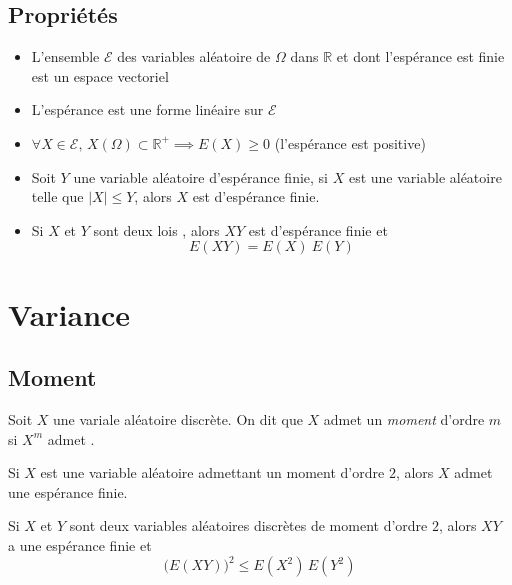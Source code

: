 \documentclass[11pt,a4paper,fleqn,pdftex]{report}
\begin{document}
\subsection{Propriétés} %
\label{sub:esperance_proprietes}
\begin{prop}
     \begin{itemize}
         \item L'ensemble $\mathscr{E}$ des variables aléatoire de $\Omega$ dans $\mathbb{R}$ et dont l'espérance est finie est un espace vectoriel
         \item L'espérance est une forme linéaire sur $\mathscr{E}$
         \item $\forall X \in \mathscr{E},\, X(\Omega) \subset \mathbb{R}^+ \implies E(X) \ge 0$ (l'espérance est positive)
         \item Soit $Y$ une variable aléatoire d'espérance finie, si $X$ est une variable aléatoire telle que $|X| \le Y$, alors $X$ est d'espérance finie.
         \item Si $X$ et $Y$ sont deux lois  , alors $XY$ est d'espérance finie et 
         \begin{equation*}
         E(XY) = E(X)\: E(Y)
         \end{equation*}
     \end{itemize}
\end{prop}
\section{Variance} %
\label{sec:variance}
\subsection{Moment} %
\label{sub:variance_moment}
\needspace{5cm}
\begin{dfn}
     Soit $X$ une variale aléatoire discrète. On dit que $X$ admet un \emph{moment} d'ordre $m$ si $X^m$ admet .
\end{dfn}
\begin{theorem}
     Si $X$ est une variable aléatoire admettant un moment d'ordre $2$, alors $X$ admet une espérance finie.
\end{theorem}
\begin{theorem}
     Si $X$ et $Y$ sont deux variables aléatoires discrètes de moment d'ordre $2$, alors $XY$ a une espérance finie et
     \begin{equation}
     \bigg( E(XY)\bigg)^2 \le E(X^2)\,E(Y^2)
     \end{equation}
\end{theorem}
\end{document}
